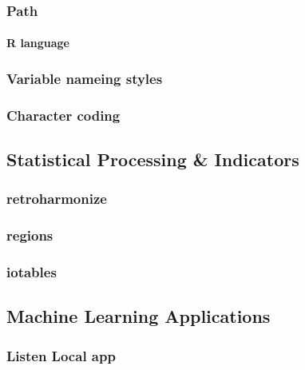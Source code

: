 \documentclass[
  fontsize=13pt,
  english,
  a4paper,
  openany, a4paper, oneside]{article}
\begin{document}
\hypertarget{path}{%
\subsubsection{Path}\label{path}}

\hypertarget{r-language}{%
\paragraph{R language}\label{r-language}}

\hypertarget{variable-nameing-styles}{%
\subsubsection{Variable nameing styles}\label{variable-nameing-styles}}

\hypertarget{character-coding}{%
\subsubsection{Character coding}\label{character-coding}}

\hypertarget{statistical-software}{%
\subsection{Statistical Processing \& Indicators}\label{statistical-software}}

\hypertarget{retroharmonize}{%
\subsubsection{retroharmonize}\label{retroharmonize}}

\hypertarget{regions}{%
\subsubsection{regions}\label{regions}}

\hypertarget{iotables}{%
\subsubsection{iotables}\label{iotables}}

\hypertarget{machine-learning-applications}{%
\subsection{Machine Learning Applications}\label{machine-learning-applications}}

\hypertarget{listen-local-app}{%
\subsubsection{Listen Local app}\label{listen-local-app}}
\end{document}
